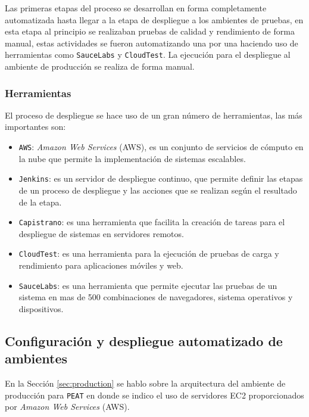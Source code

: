 
Las primeras etapas del proceso se desarrollan en forma completamente automatizada
hasta llegar a la etapa de despliegue a los ambientes de pruebas, en esta etapa
al principio se realizaban pruebas de calidad y rendimiento de forma manual, estas
actividades se fueron automatizando una por una  haciendo uso de herramientas como
\texttt{SauceLabs} y \texttt{CloudTest}. La ejecución para el despliegue al ambiente
de producción se realiza de forma manual.

\subsubsection{Herramientas}

El proceso de despliegue se hace uso de un gran número de herramientas, las más
importantes son:

\begin{itemize}
\item \texttt{AWS}: \textit{Amazon Web Services} (AWS), es un conjunto de servicios
  de cómputo en la nube que permite la implementación de sistemas escalables.
\item \texttt{Jenkins}: es un servidor de despliegue continuo, que permite
  definir las etapas de un proceso de despliegue y las acciones que se realizan
  según el resultado de la etapa.
\item \texttt{Capistrano}: es una herramienta que facilita la creación de tareas
  para el despliegue de sistemas en servidores remotos.
\item \texttt{CloudTest}: es una herramienta para la ejecución de pruebas de
  carga y rendimiento para aplicaciones móviles y web.
\item \texttt{SauceLabs}: es una herramienta que permite ejecutar las pruebas de un
  sistema en mas de 500 combinaciones de navegadores, sistema operativos
  y dispositivos.
\end{itemize}

\subsection{Configuración y despliegue automatizado de ambientes}

En la Sección \ref{sec:production} se hablo sobre la arquitectura del ambiente
de producción para \texttt{PEAT} en donde se indico el uso de servidores EC2
proporcionados por \textit{Amazon Web Services} (AWS).

